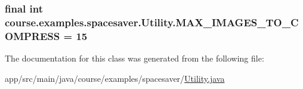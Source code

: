 \subsubsection[{M\+A\+X\+\_\+\+I\+M\+A\+G\+E\+S\+\_\+\+T\+O\+\_\+\+C\+O\+M\+P\+R\+E\+S\+S}]{\setlength{\rightskip}{0pt plus 5cm}final int course.\+examples.\+spacesaver.\+Utility.\+M\+A\+X\+\_\+\+I\+M\+A\+G\+E\+S\+\_\+\+T\+O\+\_\+\+C\+O\+M\+P\+R\+E\+S\+S = 15\hspace{0.3cm}{\ttfamily [static]}}\label{classcourse_1_1examples_1_1spacesaver_1_1_utility_a8953f2c1e57838e6e76c22071b4e5a02}


The documentation for this class was generated from the following file\+:\begin{DoxyCompactItemize}
\item 
app/src/main/java/course/examples/spacesaver/\hyperlink{_utility_8java}{Utility.\+java}\end{DoxyCompactItemize}
